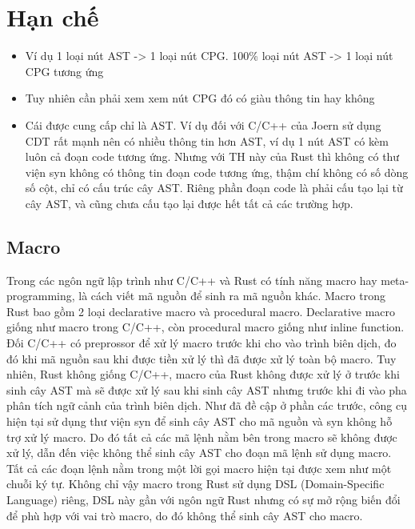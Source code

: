 \section{Hạn chế}

\begin{itemize}
    \item Ví dụ 1 loại nút AST -> 1 loại nút CPG. 100\% loại nút AST -> 1 loại nút CPG tương ứng
    \item Tuy nhiên cần phải xem xem nút CPG đó có giàu thông tin hay không
    \item Cái được cung cấp chỉ là AST. Ví dụ đối với C/C++ của Joern sử dụng CDT rất mạnh nên có nhiều thông tin hơn AST, ví dụ 1 nút AST có kèm luôn cả đoạn code tương ứng. Nhưng với TH này của Rust thì không có thư viện syn không có thông tin đoạn code tương ứng, thậm chí không có số dòng số cột, chỉ có cấu trúc cây AST. Riêng phần đoạn code là phải cấu tạo lại từ cây AST, và cũng chưa cấu tạo lại được hết tất cả các trường hợp.
\end{itemize}

\subsection{Macro}

Trong các ngôn ngữ lập trình như C/C++ và Rust có tính năng macro hay meta-programming, là cách viết mã nguồn để sinh ra mã nguồn khác.
Macro trong Rust bao gồm 2 loại declarative macro và procedural macro.
Declarative macro giống như macro trong C/C++, còn procedural macro giống như inline function.
Đối C/C++ có preprossor để xử lý macro trước khi cho vào trình biên dịch, đo đó khi mã nguồn sau khi được tiền xử lý thì đã được xử lý toàn bộ macro.
Tuy nhiên, Rust không giống C/C++, macro của Rust \cite{rustlangMacrosRust} không được xử lý ở trước khi sinh cây AST mà sẽ được xử lý sau khi sinh cây AST nhưng trước khi đi vào pha phân tích ngữ cảnh của trình biên dịch.
Như đã đề cập ở phần các trước, công cụ hiện tại sử dụng thư viện syn để sinh cây AST cho mã nguồn và syn không hỗ trợ xử lý macro.
Do đó tất cả các mã lệnh nằm bên trong macro sẽ không được xử lý, dẫn đến việc không thể sinh cây AST cho đoạn mã lệnh sử dụng macro.
Tất cả các đoạn lệnh nằm trong một lời gọi macro hiện tại được xem như một chuỗi ký tự.
Không chỉ vậy macro trong Rust sử dụng DSL (Domain-Specific Language) riêng, DSL này gần với ngôn ngữ Rust nhưng có sự mở rộng biến đổi để phù hợp với vai trò macro, do đó không thể sinh cây AST cho macro.

